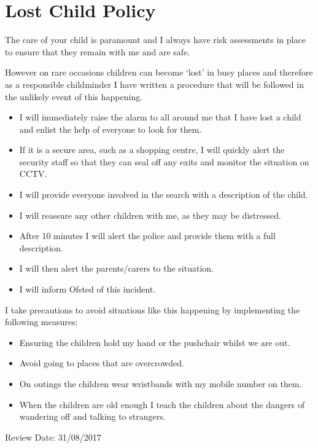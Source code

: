 

\section{Lost Child Policy}

The care of your child is paramount and I always have risk assessments
in place to ensure that they remain with me and are safe.

However on rare occasions children can become `lost' in busy places and
therefore as a responsible childminder I have written a procedure that
will be followed in the unlikely event of this happening.

\begin{itemize}
\item
  I will immediately raise the alarm to all around me that I have lost
  a child and enlist the help of everyone to look for them.
\item
  If it is a secure area, such as a shopping centre, I will quickly
  alert the security staff so that they can seal off any exits and
  monitor the situation on CCTV.
\item
  I will provide everyone involved in the search with a description of
  the child.
\item
  I will reassure any other children with me, as they may be
  distressed.
\item
  After 10 minutes I will alert the police and provide them with a
  full description.
\item
  I will then alert the parents/carers to the situation.
\item
  I will inform Ofsted of this incident.
\end{itemize}

I take precautions to avoid situations like this happening by
implementing the following measures:

\begin{itemize}
\item
  Ensuring the children hold my hand or the pushchair whilst we are
  out.
\item
  Avoid going to places that are overcrowded.
\item
  On outings the children wear wristbands with my mobile number on
  them.
\item
  When the children are old enough I teach the children about the
  dangers of wandering off and talking to strangers.
\end{itemize}

Review Date: 31/08/2017


